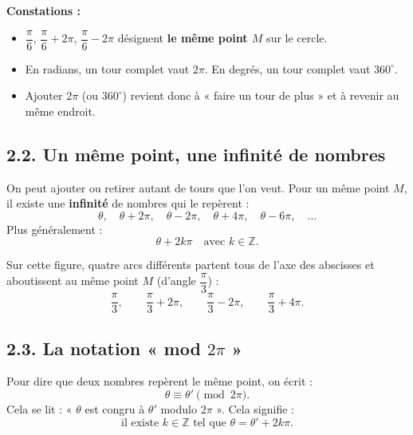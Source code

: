 \documentclass[11pt,a4paper]{article}
\begin{document}
\textbf{Constations :}
\begin{itemize}
  \item $\dfrac{\pi}{6}$, \quad $\dfrac{\pi}{6}+2\pi$, \quad $\dfrac{\pi}{6}-2\pi$ \quad désignent \textbf{le même point $M$} sur le cercle.
  \item En radians, un tour complet vaut $2\pi$. En degrés, un tour complet vaut $360^\circ$.
  \item Ajouter $2\pi$ (ou $360^\circ$) revient donc à « faire un tour de plus » et à revenir au même endroit.
\end{itemize}

\subsection*{2.2. Un même point, une infinité de nombres}

On peut ajouter ou retirer autant de tours que l'on veut. Pour un même point $M$, il existe une \textbf{infinité} de nombres qui le repèrent :
\[
\theta,\quad \theta+2\pi,\quad \theta-2\pi,\quad \theta+4\pi,\quad \theta-6\pi,\quad\ldots
\]
Plus généralement :
\[
\theta+2k\pi \quad \text{avec } k\in\mathbb{Z}.
\]

\begin{center}
\end{center}

Sur cette figure, quatre arcs différents partent tous de l'axe des abscisses et aboutissent au même point $M$ (d'angle $\dfrac{\pi}{3}$) :
\[
\dfrac{\pi}{3},\qquad
\dfrac{\pi}{3}+2\pi,\qquad
\dfrac{\pi}{3}-2\pi,\qquad
\dfrac{\pi}{3}+4\pi.
\]

\subsection*{2.3. La notation « mod $2\pi$ »}

Pour dire que deux nombres repèrent le même point, on écrit :
\[
\theta \equiv \theta' \pmod{2\pi}.
\]
Cela se lit : « $\theta$ est congru à $\theta'$ modulo $2\pi$ ». Cela signifie :
\[
\text{il existe } k\in\mathbb{Z} \text{ tel que } \theta=\theta'+2k\pi.
\]
\end{document}
